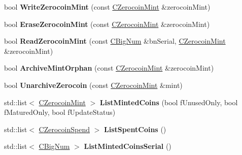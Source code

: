 \begin{DoxyCompactItemize}
\mbox{\label{class_c_wallet_d_b_a2464550fd457eb078a44077e5b416e9a}} 
bool {\bfseries Write\+Zerocoin\+Mint} (const \mbox{\hyperlink{class_c_zerocoin_mint}{C\+Zerocoin\+Mint}} \&zerocoin\+Mint)
\item 
\mbox{\label{class_c_wallet_d_b_a50277c729cfe9c74ada9348940555ca7}} 
bool {\bfseries Erase\+Zerocoin\+Mint} (const \mbox{\hyperlink{class_c_zerocoin_mint}{C\+Zerocoin\+Mint}} \&zerocoin\+Mint)
\item 
\mbox{\label{class_c_wallet_d_b_a04e3ab47dad300153ec8acef739e311d}} 
bool {\bfseries Read\+Zerocoin\+Mint} (const \mbox{\hyperlink{class_c_big_num}{C\+Big\+Num}} \&bn\+Serial, \mbox{\hyperlink{class_c_zerocoin_mint}{C\+Zerocoin\+Mint}} \&zerocoin\+Mint)
\item 
\mbox{\label{class_c_wallet_d_b_a77aae06150b1eef721d471a454666df0}} 
bool {\bfseries Archive\+Mint\+Orphan} (const \mbox{\hyperlink{class_c_zerocoin_mint}{C\+Zerocoin\+Mint}} \&zerocoin\+Mint)
\item 
\mbox{\label{class_c_wallet_d_b_a14f4aec1c9be3a6961f5c22b020395f5}} 
bool {\bfseries Unarchive\+Zerocoin} (const \mbox{\hyperlink{class_c_zerocoin_mint}{C\+Zerocoin\+Mint}} \&mint)
\item 
\mbox{\label{class_c_wallet_d_b_a906d7b97c6b94f4225957d576222bbb6}} 
std\+::list$<$ \mbox{\hyperlink{class_c_zerocoin_mint}{C\+Zerocoin\+Mint}} $>$ {\bfseries List\+Minted\+Coins} (bool f\+Unused\+Only, bool f\+Matured\+Only, bool f\+Update\+Status)
\item 
\mbox{\label{class_c_wallet_d_b_a5449bc8b79d73dcbaca52ad9aacde230}} 
std\+::list$<$ \mbox{\hyperlink{class_c_zerocoin_spend}{C\+Zerocoin\+Spend}} $>$ {\bfseries List\+Spent\+Coins} ()
\item 
\mbox{\label{class_c_wallet_d_b_af92fbfad1f351ddb2fd3d3991d58466f}} 
std\+::list$<$ \mbox{\hyperlink{class_c_big_num}{C\+Big\+Num}} $>$ {\bfseries List\+Minted\+Coins\+Serial} ()
\item 
\mbox{\label{class_c_wallet_d_b_af9f4cd1e9a193d0fbfef9f0864ee2eed}} 

\end{DoxyCompactItemize}
